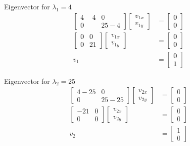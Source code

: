 \documentclass[11pt,letterpaper]{article}
\begin{document}
\begin{enumerate}
Eigenvector for \( \lambda_1 = 4 \)
\begin{align*}
    \begin{bmatrix}
        4-4 & 0 \\
        0 & 25-4
    \end{bmatrix}
    \begin{bmatrix}
        v_{1x} \\ v_{1y}
    \end{bmatrix}
    &= \begin{bmatrix}
        0 \\ 0
    \end{bmatrix} \\
    \begin{bmatrix}
        0 & 0 \\
        0 & 21
    \end{bmatrix}
    \begin{bmatrix}
        v_{1x} \\ v_{1y}
    \end{bmatrix}
    &= \begin{bmatrix}
        0 \\ 0
    \end{bmatrix} \\
    v_1
    &= \begin{bmatrix}
        0 \\ 1
    \end{bmatrix}
\end{align*}

Eigenvector for \( \lambda_2 = 25 \)
\begin{align*}
    \begin{bmatrix}
        4-25 & 0 \\
        0 & 25-25
    \end{bmatrix}
    \begin{bmatrix}
        v_{2x} \\ v_{2y}
    \end{bmatrix}
    &= \begin{bmatrix}
        0 \\ 0
    \end{bmatrix} \\
    \begin{bmatrix}
        -21 & 0 \\
        0 & 0
    \end{bmatrix}
    \begin{bmatrix}
        v_{2x} \\ v_{2y}
    \end{bmatrix}
    &= \begin{bmatrix}
        0 \\ 0
    \end{bmatrix} \\
    v_2
    &= \begin{bmatrix}
        1 \\ 0
    \end{bmatrix}
\end{align*}


\end{enumerate}
\end{document}
